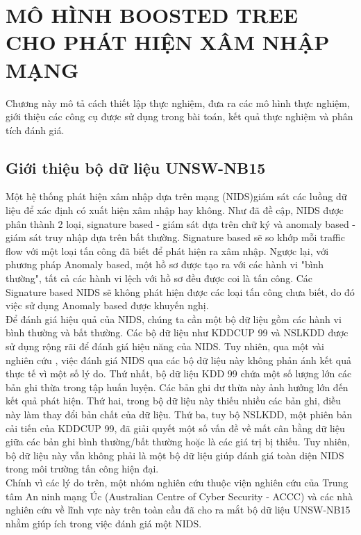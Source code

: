 \pagestyle{plain}
\graphicspath{{Chapter3/Figs/Raster/}{Chapter3/Figs/}}
\chapter{MÔ HÌNH BOOSTED TREE CHO PHÁT HIỆN XÂM NHẬP MẠNG}
Chương này mô tả cách thiết lập thực nghiệm, đưa ra các mô hình thực  nghiệm, giới thiệu các công cụ được sử dụng trong bài toán, kết quả thực nghiệm và phân tích đánh giá.
\section{Giới thiệu bộ dữ liệu UNSW-NB15}

Một hệ thống phát hiện xâm nhập dựa trên mạng (NIDS)giám sát các luồng dữ liệu để xác định có xuất hiện xâm nhập hay không. Như đã đề cập, NIDS được phân thành 2 loại, signature based - giám sát dựa trên chữ ký và anomaly based - giám sát truy nhập dựa trên bất thường. Signature based sẽ so khớp mỗi traffic flow với một loại tấn công đã biết để phát hiện ra xâm nhập. Ngược lại, với phương pháp Anomaly based, một hồ sơ được tạo ra với các hành vi "bình thường", tất cả các hành vi lệch với hồ sơ đều được coi là tấn công. Các Signature based NIDS sẽ không phát hiện được các loại tấn công chưa biết, do đó việc sử dụng Anomaly based được khuyến nghị.\\
\indent Để đánh giá hiệu quả của NIDS, chúng ta cần một bộ dữ liệu gồm các hành vi bình thường và bất thường. Các bộ dữ liệu như KDDCUP 99 \cite{kdd99} và NSLKDD \cite{nslkdd} được sử dụng rộng rãi để đánh giá hiệu năng của NIDS. Tuy nhiên, qua một vài nghiên cứu \cite{17}\cite{18}\cite{19}\cite{20}, việc đánh giá NIDS qua các bộ dữ liệu này không phản ánh kết quả thực tế vì một số lý do. Thứ nhất, bộ dữ liệu KDD 99 chứa một số lượng lớn các bản ghi thừa trong tập huấn luyện. Các bản ghi dư thừa này ảnh hưởng lớn đến kết quả phát hiện. Thứ hai, trong bộ dữ liệu này thiếu nhiều các bản ghi, điều này làm thay đổi bản chất của dữ liệu. Thứ ba, tuy bộ NSLKDD, một phiên bản cải tiến của KDDCUP 99, đã giải quyết một số vấn đề về mất cân bằng dữ liệu giữa các bản ghi bình thường/bất thường hoặc là các giá trị bị thiếu. Tuy nhiên, bộ dữ liệu này vẫn không phải là một bộ dữ liệu giúp đánh giá toàn diện NIDS trong môi trường tấn công hiện đại.\\
\indent Chính vì các lý do trên, một nhóm nghiên cứu thuộc viện nghiên cứu của Trung tâm An ninh mạng Úc (Australian Centre of Cyber Security - ACCC) và các nhà nghiên cứu về lĩnh vực này trên toàn cầu đã cho ra mắt bộ dữ liệu UNSW-NB15 nhằm giúp ích trong việc đánh giá một NIDS.

